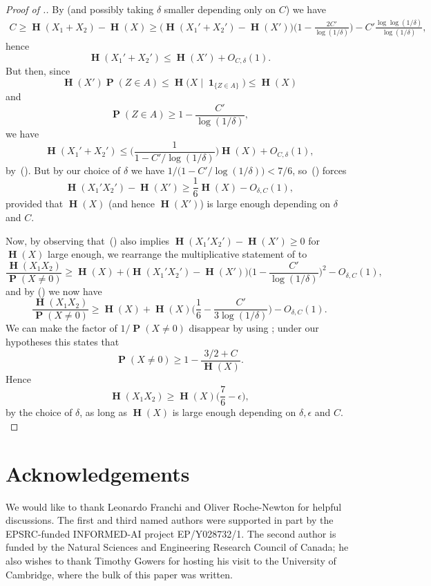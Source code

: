 \documentclass[twoside, 10pt]{article}
\renewcommand{\eqref}[1]{\textup{{\normalfont(\oldstylenums{\ref{#1}}}\normalfont)}}
\DeclareMathOperator{\Eta}{\mathbf{H}}
\DeclareMathOperator{\pr}{\mathbf{P}}
\newcommand\given{\mathbin{|}}
\newcommand{\one}{\mathop{\mathbf{1}}\nolimits}
\begin{document}
\begin{proof}[Proof of .]
By  (and possibly taking $\delta$ smaller depending only on $C$) we have
\begin{equation}\begin{aligned} \label{taoprimesestimate}
C \ge \Eta(X_1 + X_2) - \Eta(X)
\ge \bigl(\Eta(X_1' + X_2') - \Eta(X')\bigr)\biggl(1-\frac{2C'}{\log(1/\delta)}\biggr) - C'\frac{\log\log(1/\delta)}{\log(1/\delta)},
\end{aligned}\end{equation}
hence
$$\Eta(X_1' + X_2') \le \Eta(X') + O_{C,\delta}(1).$$
But then, since
$$\Eta(X') \pr(Z\in A) \le \Eta\bigl(X\given 
\one_{\{Z\in A\}}\bigr)\le \Eta(X)$$
and
$$\pr(Z\in A) \ge 1- \frac{C'}{\log(1/\delta)},$$
we have
$$\Eta(X_1'+X_2')\le \biggl(\frac{1}{ 1-C'/\log(1/\delta)}\biggr) \Eta(X) + O_{C,\delta}(1),$$
by~\eqref{eqCoverlog}.
But by our choice of $\delta$ we have $1/\bigl(1-C'/\log(1/\delta)\bigr) <7/6$, so~\eqref{primefirstsp} forces
\begin{equation} \label{multdoublinglarge}
\Eta(X_1'X_2') -\Eta(X') \geq \frac{1}{6}\Eta(X) - O_{\delta,C}(1),
\end{equation}
provided that $\Eta(X)$ (and hence $\Eta(X')$) is large enough depending on $\delta$ and $C$.

Now, by observing that~\eqref{multdoublinglarge} also implies $\Eta(X_1' X_2') - \Eta(X') \geq 0$ for $\Eta(X)$ large enough, we rearrange the multiplicative statement of  to
$$\frac{\Eta(X_1 X_2)}{\pr(X\ne 0)} \ge \Eta(X)
+ \bigl(\Eta(X_1' X_2') - \Eta(X')\bigr)\biggl(1-\frac{C'}{\log(1/\delta)}\biggr)^2 - O_{\delta,C}(1),$$
and by \eqref{multdoublinglarge} we now have
$$
\frac{\Eta(X_1 X_2)}{\pr(X\ne 0)} \ge \Eta(X) + \Eta(X)\biggl(\frac16-\frac{C'}{3\log(1/\delta)}\biggr) - O_{\delta,C}(1).
$$
We can make the factor of $1/\pr(X\ne 0)$ disappear by using ; under our hypotheses this states that
$$\pr(X\ne 0) \geq 1- \frac{3/2+C}{\Eta(X)}.$$
Hence
$$
\Eta(X_1 X_2) \ge  \Eta(X)\biggl(\frac76-\epsilon\biggr),
$$
by the choice of $\delta$, as long as $\Eta(X)$ is large enough depending on $\delta, \epsilon$ and $C.$
\end{proof}

\section*{Acknowledgements}

We would like to thank Leonardo Franchi and Oliver Roche-Newton for helpful discussions. The first and third named authors were supported in part by the {\small EPSRC}-funded {\small INFORMED-AI} project EP/Y028732/1. The second author is funded by the Natural Sciences and Engineering Research Council of Canada; he also wishes to thank Timothy Gowers for hosting his visit to the University of Cambridge, where the bulk of this paper was written.
\end{document}
